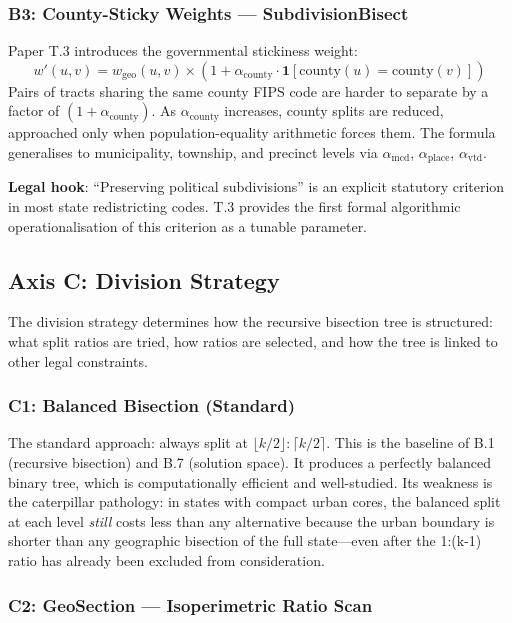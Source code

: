 \subsubsection*{B3: County-Sticky Weights --- SubdivisionBisect}

Paper T.3 introduces the governmental stickiness weight:
\[
  w'(u,v) = w_\text{geo}(u,v) \times (1 + \alpha_\text{county} \cdot \mathbf{1}[\text{county}(u) = \text{county}(v)])
\]
Pairs of tracts sharing the same county FIPS code are harder to separate by
a factor of $(1 + \alpha_\text{county})$.
As $\alpha_\text{county}$ increases, county splits are reduced, approached
only when population-equality arithmetic forces them.
The formula generalises to municipality, township, and precinct levels via
$\alpha_\text{mcd}$, $\alpha_\text{place}$, $\alpha_\text{vtd}$.

\textbf{Legal hook}: ``Preserving political subdivisions'' is an explicit
statutory criterion in most state redistricting codes.
T.3 provides the first formal algorithmic operationalisation of this criterion
as a tunable parameter.

\subsection{Axis C: Division Strategy}

The division strategy determines how the recursive bisection tree is structured:
what split ratios are tried, how ratios are selected, and how the tree is
linked to other legal constraints.

\subsubsection*{C1: Balanced Bisection (Standard)}

The standard approach: always split at $\lfloor k/2 \rfloor : \lceil k/2 \rceil$.
This is the baseline of B.1 (recursive bisection) and B.7 (solution space).
It produces a perfectly balanced binary tree, which is computationally efficient
and well-studied.
Its weakness is the caterpillar pathology: in states with compact urban cores,
the balanced split at each level \emph{still} costs less than any alternative
because the urban boundary is shorter than any geographic bisection of the full
state---even after the 1:(k-1) ratio has already been excluded from consideration.

\subsubsection*{C2: GeoSection --- Isoperimetric Ratio Scan}

